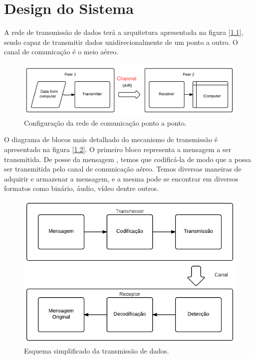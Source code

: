 

\chapter[DESIGN DO SISTEMA]{Design do Sistema}

A rede de transmissão de dados terá a arquitetura apresentada na figura [\ref{Fig: rede ponto a ponto}], sendo capaz de transmitir dados unidirecionalmente de um ponto a outro. O canal de comunicação é o meio aéreo.

\begin{figure}
	\centering
		\includegraphics[keepaspectratio=true scale=0.3]{figuras/network-connection}
	\caption{Configuração da rede de comunicação ponto a ponto.}
	\label{Fig: rede ponto a ponto}
\end{figure}

O diagrama de blocos mais detalhado do mecanismo de transmissão é apresentado na figura [\ref{Fig: Esquema simplificado da transmissão de dados}]. O primeiro bloco representa a mensagem a ser transmitida. De posse da mensagem , temos que codificá-la de modo que a possa ser transmitida pelo canal de comunicação aéreo. Temos diversas maneiras de adquirir e armazenar a mensagem, e a mesma pode se encontrar em diversos formatos como binário, áudio, vídeo dentre outros.

\begin{figure}
	\centering
		\includegraphics[keepaspectratio=true scale=0.3]{figuras/diagrama_transmissao}
	\caption{Esquema simplificado da transmissão de dados.}
	\label{Fig: Esquema simplificado da transmissão de dados}
\end{figure}

